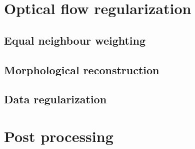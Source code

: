 \section{Optical flow regularization}
\subsection{Equal neighbour weighting}
\subsection{Morphological reconstruction}
\subsection{Data regularization}
\section{Post processing}